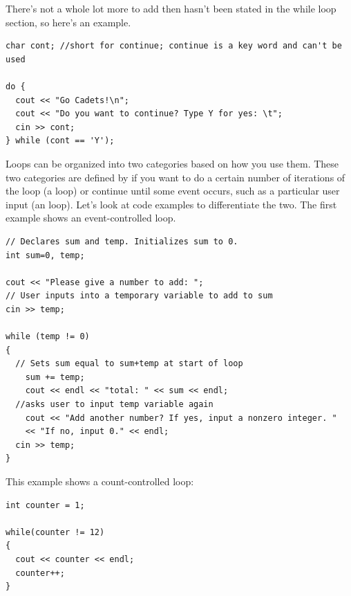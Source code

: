 There's not a whole lot more to add then hasn't been stated in the while loop section, so here's an example.

\noindent\begin{minipage}{\linewidth}\begin{lstlisting}
char cont; //short for continue; continue is a key word and can't be used

do {
  cout << "Go Cadets!\n";
  cout << "Do you want to continue? Type Y for yes: \t";
  cin >> cont;
} while (cont == 'Y');
\end{lstlisting}\end{minipage}


Loops can be organized into two categories based on how you use them.
These two categories are defined by if you want to do a certain number of iterations of the loop (a  loop) or continue until some event occurs, such as a particular user input (an  loop).
Let's look at code examples to differentiate the two. The first example shows an event-controlled  loop.

\noindent\begin{minipage}{\linewidth}\begin{lstlisting}
// Declares sum and temp. Initializes sum to 0.
int sum=0, temp; 

cout << "Please give a number to add: ";
// User inputs into a temporary variable to add to sum
cin >> temp;	

while (temp != 0) 
{
  // Sets sum equal to sum+temp at start of loop
	sum += temp;	
	cout << endl << "total: " << sum << endl;	
  //asks user to input temp variable again
	cout << "Add another number? If yes, input a nonzero integer. "
    << "If no, input 0." << endl;	
  cin >> temp;
}
\end{lstlisting}\end{minipage}

\noindent This example shows a count-controlled  loop:

\noindent\begin{minipage}{\linewidth}\begin{lstlisting}
int counter = 1;

while(counter != 12)
{
  cout << counter << endl;
  counter++;
}
\end{lstlisting}\end{minipage}


